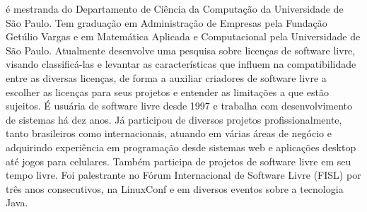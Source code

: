 é mestranda do Departamento de Ciência da Computação da Universidade
de São Paulo.
%
Tem graduação em Administração de Empresas pela Fundação Getúlio
Vargas e em Matemática Aplicada e Computacional pela Universidade de
São Paulo.
%
Atualmente desenvolve uma pesquisa sobre licenças de software livre,
visando classificá-las e levantar as características que influem na
compatibilidade entre as diversas licenças, de forma a auxiliar
criadores de software livre a escolher as licenças para seus projetos
e entender as limitações a que estão sujeitos.
%
É usuária de software livre desde 1997 e trabalha com desenvolvimento
de sistemas há dez anos.
%
Já participou de diversos projetos profissionalmente, tanto
brasileiros como internacionais, atuando em várias áreas de negócio e
adquirindo experiência em programação desde sistemas web e aplicações
desktop até jogos para celulares.
%
Também participa de projetos de software livre em seu tempo livre. Foi
palestrante no Fórum Internacional de Software Livre (FISL) por
três anos consecutivos, na LinuxConf e em diversos eventos sobre
a tecnologia Java.


